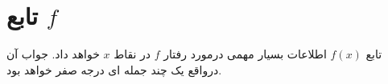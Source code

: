 \section{تابع $f$}


تابع $f(x)$ اطلاعات بسیار مهمی درمورد رفتار $f$ در نقاط $x$ خواهد داد.
جواب آن درواقع یک چند جمله ای درجه صفر خواهد بود.

